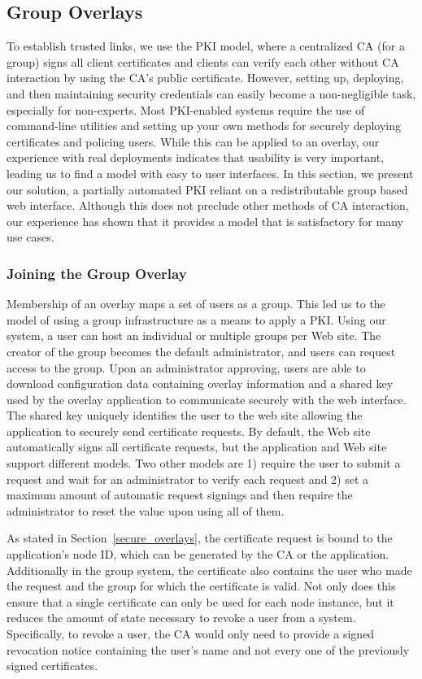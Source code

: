 \documentclass[conference]{IEEEtran}
\begin{document}
\subsection{Group Overlays}
\label{group_overlays}
To establish trusted links, we use the PKI model, where a centralized CA (for a group) signs
all client certificates and clients can verify each other without CA interaction
by using the CA's public certificate.  However, setting up, deploying, and then
maintaining security credentials can easily become a non-negligible task,
especially for non-experts.  Most PKI-enabled systems require the use of
command-line utilities and setting up your own methods for securely
deploying certificates and policing users.  While this can be applied to an
overlay, our experience with real deployments indicates that usability is very
important, leading us to find a model with easy to user interfaces.
In this section, we present our solution, a partially automated PKI reliant on
a redistributable group based web interface.  Although this does not preclude
other methods of CA interaction, our experience has shown that it provides a
model that is satisfactory for many use cases.

\subsubsection{Joining the Group Overlay}
Membership of an overlay maps a set of users as a group. This led us to the
model of using a group infrastructure as a means to apply a PKI.  Using our
system, a user can host an individual or multiple groups per Web site.  The
creator of the group becomes the default administrator, and users can request
access to the group.  Upon an administrator approving, users are able to
download configuration data containing overlay information and a shared key
used by the overlay application to communicate securely with the web interface.
The shared key uniquely identifies the user to the web site allowing the
application to securely send certificate requests.  By default, the Web site
automatically signs all certificate requests, but the application and Web site
support different models.  Two other models are 1) require the user to
submit a request and wait for an administrator to verify each request and 2)
set a maximum amount of automatic request signings and then require the 
administrator to reset the value upon using all of them.

As stated in Section~\ref{secure_overlays}, the certificate request is bound
to the application's node ID, which can be generated by the CA or the
application.  Additionally in the group system, the certificate also contains
the user who made the request and the group for which the certificate is valid.
Not only does this ensure that a single certificate can only be used for each
node instance, but it reduces the amount of state necessary to revoke a user
from a system.  Specifically, to revoke a user, the CA would only need to
provide a signed revocation notice containing the user's name and not every one
of the previously signed certificates.
\end{document}
